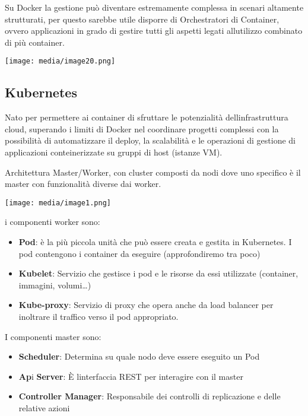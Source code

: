 Su Docker la gestione può diventare estremamente complessa in scenari
altamente strutturati, per questo sarebbe utile disporre di
Orchestratori di Container, ovvero applicazioni in grado di gestire
tutti gli aspetti legati all\textquotesingle utilizzo combinato di più
container.

\texttt{[image: media/image20.png]}

\subsection{Kubernetes}\label{kubernetes-1}

Nato per permettere ai container di sfruttare le potenzialità
dell\textquotesingle infrastruttura cloud, superando i limiti di Docker
nel coordinare progetti complessi con la possibilità di automatizzare il
deploy, la scalabilità e le operazioni di gestione di applicazioni
conteinerizzate su gruppi di host (istanze VM).

Architettura Master/Worker, con cluster composti da nodi dove uno
specifico è il master con funzionalità diverse dai worker.

\texttt{[image: media/image1.png]}

i componenti worker sono:

\begin{itemize}
\item
  \textbf{Pod}: è la più piccola unità che può essere creata e gestita
  in Kubernetes. I pod contengono i container da eseguire
  (approfondiremo tra poco)
\item
  \textbf{Kubelet}: Servizio che gestisce i pod e le risorse da essi
  utilizzate (container, immagini, volumi\ldots)
\item
  \textbf{Kube-proxy}: Servizio di proxy che opera anche da load
  balancer per inoltrare il traffico verso il pod appropriato.
\end{itemize}

I componenti master sono:

\begin{itemize}
\item
  \textbf{Scheduler}: Determina su quale nodo deve essere eseguito un
  Pod
\item
  \textbf{Ap}i \textbf{Server}: È l\textquotesingle interfaccia REST per
  interagire con il master
\item
  \textbf{Controller Manager}: Responsabile dei controlli di
  replicazione e delle relative azioni
\end{itemize}

